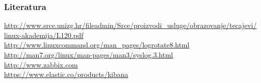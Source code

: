 \documentclass[t,table,usenames,dvipsnames]{beamer}
\begin{document}
\begin{frame}
	\frametitle{Literatura}
	\url{http://www.srce.unizg.hr/fileadmin/Srce/proizvodi_usluge/obrazovanje/tecajevi/linux-akademija/L120.pdf}
	\vfill
	\url{http://www.linuxcommand.org/man_pages/logrotate8.html}\\
	\url{http://man7.org/linux/man-pages/man3/syslog.3.html}\\
	\vfill
	\url{http://www.zabbix.com}\\
	\vfill
	\url{https://www.elastic.co/products/kibana}\\
\end{frame}
\end{document}
